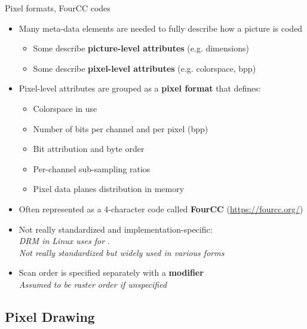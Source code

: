 \begin{frame}[fragile]{Pixel formats, FourCC codes}
  \begin{itemize}
  \item Many meta-data elements are needed to fully describe how a picture is coded
    \begin{itemize}
    \item Some describe \textbf{picture-level attributes} (e.g. dimensions)
    \item Some describe \textbf{pixel-level attributes} (e.g. colorspace, bpp)
    \end{itemize}
  \item Pixel-level attributes are grouped as a \textbf{pixel format} that defines:
    \begin{itemize}
    \item Colorspace in use
    \item Number of bits per channel and per pixel (bpp)
    \item Bit attribution and byte order
    \item Per-channel sub-sampling ratios
    \item Pixel data planes distribution in memory
    \end{itemize}
  \item Often represented as a 4-character code called \textbf{FourCC} {\small(\url{https://fourcc.org/})}\\
  \item Not really standardized and implementation-specific:\\
    \textit{DRM in Linux uses  for }.\\
  \textit{Not really standardized but widely used in various forms}
  \item Scan order is specified separately with a \textbf{modifier}\\
    \textit{Assumed to be raster order if unspecified}
  \end{itemize}
\end{frame}

\subsection{Pixel Drawing}

